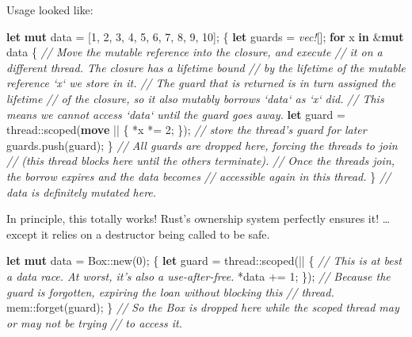 \documentclass[a4paper,]{book}
\newenvironment{Shaded}{\begin{snugshade}}{\end{snugshade}}
\newcommand{\KeywordTok}[1]{\textcolor[rgb]{0.13,0.29,0.53}{\textbf{{#1}}}}
\newcommand{\DataTypeTok}[1]{\textcolor[rgb]{0.13,0.29,0.53}{{#1}}}
\newcommand{\DecValTok}[1]{\textcolor[rgb]{0.00,0.00,0.81}{{#1}}}
\newcommand{\CommentTok}[1]{\textcolor[rgb]{0.56,0.35,0.01}{\textit{{#1}}}}
\newcommand{\PreprocessorTok}[1]{\textcolor[rgb]{0.56,0.35,0.01}{\textit{{#1}}}}
\newcommand{\NormalTok}[1]{{#1}}
\begin{document}
Usage looked like:

\begin{Shaded}
\begin{Highlighting}[]
\KeywordTok{let} \KeywordTok{mut} \NormalTok{data = [}\DecValTok{1}\NormalTok{, }\DecValTok{2}\NormalTok{, }\DecValTok{3}\NormalTok{, }\DecValTok{4}\NormalTok{, }\DecValTok{5}\NormalTok{, }\DecValTok{6}\NormalTok{, }\DecValTok{7}\NormalTok{, }\DecValTok{8}\NormalTok{, }\DecValTok{9}\NormalTok{, }\DecValTok{10}\NormalTok{];}
\NormalTok{\{}
    \KeywordTok{let} \NormalTok{guards = }\PreprocessorTok{vec!}\NormalTok{[];}
    \KeywordTok{for} \NormalTok{x }\KeywordTok{in} \NormalTok{&}\KeywordTok{mut} \NormalTok{data \{}
        \CommentTok{// Move the mutable reference into the closure, and execute}
        \CommentTok{// it on a different thread. The closure has a lifetime bound}
        \CommentTok{// by the lifetime of the mutable reference `x` we store in it.}
        \CommentTok{// The guard that is returned is in turn assigned the lifetime}
        \CommentTok{// of the closure, so it also mutably borrows `data` as `x` did.}
        \CommentTok{// This means we cannot access `data` until the guard goes away.}
        \KeywordTok{let} \NormalTok{guard = thread::scoped(}\KeywordTok{move} \NormalTok{|| \{}
            \NormalTok{*x *= }\DecValTok{2}\NormalTok{;}
        \NormalTok{\});}
        \CommentTok{// store the thread's guard for later}
        \NormalTok{guards.push(guard);}
    \NormalTok{\}}
    \CommentTok{// All guards are dropped here, forcing the threads to join}
    \CommentTok{// (this thread blocks here until the others terminate).}
    \CommentTok{// Once the threads join, the borrow expires and the data becomes}
    \CommentTok{// accessible again in this thread.}
\NormalTok{\}}
\CommentTok{// data is definitely mutated here.}
\end{Highlighting}
\end{Shaded}

In principle, this totally works! Rust's ownership system perfectly
ensures it! \ldots{}except it relies on a destructor being called to be
safe.

\begin{Shaded}
\begin{Highlighting}[]
\KeywordTok{let} \KeywordTok{mut} \NormalTok{data = }\DataTypeTok{Box}\NormalTok{::new(}\DecValTok{0}\NormalTok{);}
\NormalTok{\{}
    \KeywordTok{let} \NormalTok{guard = thread::scoped(|| \{}
        \CommentTok{// This is at best a data race. At worst, it's also a use-after-free.}
        \NormalTok{*data += }\DecValTok{1}\NormalTok{;}
    \NormalTok{\});}
    \CommentTok{// Because the guard is forgotten, expiring the loan without blocking this}
    \CommentTok{// thread.}
    \NormalTok{mem::forget(guard);}
\NormalTok{\}}
\CommentTok{// So the Box is dropped here while the scoped thread may or may not be trying}
\CommentTok{// to access it.}
\end{Highlighting}
\end{Shaded}
\end{document}
